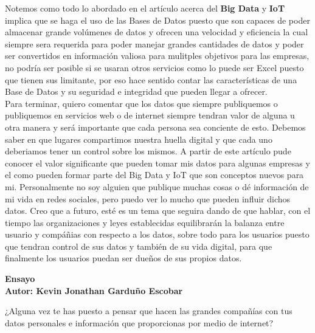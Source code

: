 \documentclass[12pt]{report}
\begin{document}
\begin{enumerate}[label=\textbf{\arabic*.}, leftmargin=*]
\begin{enumerate}[label=\textbf{\alph*.}, leftmargin=*, itemsep=1.0em]
Notemos como todo lo abordado en el artículo acerca del \textbf{Big Data} y \textbf{IoT} implica que se haga el uso de las Bases de Datos puesto que son capaces de poder almacenar grande volúmenes de datos y ofrecen una velocidad y eficiencia la cual siempre sera requerida para poder manejar grandes cantidades de datos y poder ser convertidos en información valiosa para mulitples objetivos para las empresas, no podría ser posible si se usaran otros servicios como lo puede ser Excel puesto que tienen sus limitante, por eso hace sentido contar las características de una Base de Datos y su seguridad e integridad que pueden llegar a ofrecer. \\

Para terminar, quiero comentar que los datos que siempre publiquemos o publiquemos en servicios web o de internet siempre tendran valor de alguna u otra manera y será importante que cada persona sea conciente de esto. Debemos saber en que lugares compartimos nuestra huella digital y que cada uno deberiamos tener un control sobre los mismos. A partir de este artículo pude conocer el valor significante que pueden tomar mis datos para algunas empresas y el como pueden formar parte del Big Data y IoT que son conceptos nuevos para mi. Personalmente no soy alguien que publique muchas cosas o dé información de mi vida en redes sociales, pero puedo ver lo mucho que pueden influir dichos datos. Creo que a futuro, esté es un tema que seguira dando de que hablar, con el tiempo las organizaciones y leyes establecidas equilibrarán la balanza entre usuario y compáñias con respecto a los datos, sobre todo para los usuarios puesto que tendran control de sus datos y también de su vida digital, para que finalmente los usuarios puedan ser dueños de sus propios datos.

\newpage
\textbf{Ensayo\\
        Autor: Kevin Jonathan Garduño Escobar}

¿Alguna vez te has puesto a pensar que hacen las grandes compañías con tus datos personales e información que proporcionas por medio de internet?\\


\end{enumerate}
\end{enumerate}
\end{document}
